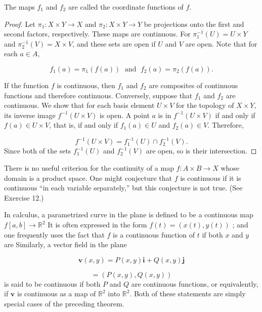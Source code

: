The maps \(f_{1}\) and \(f_{2}\) are called the coordinate functions of \(f\).

\begin{proof}
 Let \({\pi }_{1} : X \times Y \rightarrow X\) and \({\pi }_{2} : X \times Y \rightarrow Y\) be projections onto the first and second factors, respectively. These maps are continuous. For \({\pi }_1^{-1}( U) = U \times Y\) and \({\pi }_2^{-1}( V) = X \times V\), and these sets are open if \(U\) and \(V\) are open. Note that for each \(a \in A\),

 \[
 f_{1}( a) = {\pi }_{1}( {f( a) }) \;\text{ and }\;f_{2}( a) = {\pi }_{2}( {f( a) }).
 \]

 If the function \(f\) is continuous, then \(f_{1}\) and \(f_{2}\) are composites of continuous functions and therefore continuous. Conversely, suppose that \(f_{1}\) and \(f_{2}\) are continuous. We show that for each basis element \(U \times V\) for the topology of \(X \times Y\), its inverse image \(f^{-1}( {U \times V})\) is open. A point \(a\) is in \(f^{-1}( {U \times V})\) if and only if \(f( a) \in U \times V\), that is, if and only if \(f_{1}( a) \in U\) and \(f_{2}( a) \in V\). Therefore,

 \[
 f^{-1}( {U \times V}) = f_1^{-1}( U) \cap {f}_2^{-1}( V).
 \]
 Since both of the sets \(f_1^{-1}( U)\) and \(f_2^{-1}( V)\) are open, so is their intersection.
\end{proof}

There is no useful criterion for the continuity of a map \(f : A \times B \rightarrow X\) whose domain is a product space. One might conjecture that \(f\) is continuous if it is continuous ``in each variable separately,'' but this conjecture is not true. (See Exercise 12.)

\begin{centeredblock}
\begin{example}
\label{ex:\thesection.\theexample}
 In calculus, a parametrized curve in the plane is defined to be a continuous map \(f[ {a,b}] \rightarrow {\mathbb{R}}^{2}\) It is often expressed in the form \(f( t) = ( {x( t),y( t) })\) ; and one frequently uses the fact that \(f\) is a continuous function of \(t\) if both \(x\) and \(y\) are Similarly, a vector field in the plane

 \[
 \mathbf{v}( {x,y}) = P( {x,y}) \mathbf{i} + Q( {x,y}) \mathbf{j}
 \]

 \[
 = ( {P( {x,y}),Q( {x,y}) })
 \]
is said to be continuous if both \(P\) and \(Q\) are continuous functions, or equivalently, if \(\mathbf{v}\) is continuous as a map of \(\mathbb{R}^{2}\) into \(\mathbb{R}^{2}\). Both of these statements are simply special cases of the preceding theorem.
\end{example}
\end{centeredblock}

